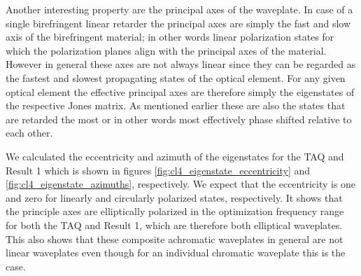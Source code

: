 Another interesting property are the principal axes of the waveplate. In case of a single birefringent linear retarder the principal axes are simply the fast and slow axis of the birefringent material; in other words linear polarization states for which the polarization planes align with the principal axes of the material. However in general these axes are not always linear since they can be regarded as the fastest and slowest propagating states of the optical element. For any given optical element the effective principal axes are therefore simply the eigenstates of the respective Jones matrix. As mentioned earlier these are also the states that are retarded the most or in other words most effectively phase shifted relative to each other. 

We calculated the eccentricity and azimuth of the eigenstates for the TAQ and Result 1 which is shown in figures \ref{fig:cl4_eigenstate_eccentricity} and \ref{fig:cl4_eigenstate_azimuths}, respectively. We expect that the eccentricity is one and zero for linearly and circularly polarized states, respectively. It shows that the principle axes are elliptically polarized in the optimization frequency range for both the TAQ and Result 1, which are therefore both elliptical waveplates. This also shows that these composite achromatic waveplates in general are not linear waveplates even though for an individual chromatic waveplate this is the case.

